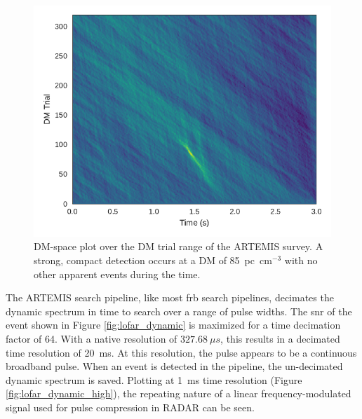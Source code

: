 \documentclass[a4paper,fleqn,usenatbib]{mnras}
\begin{document}
\begin{figure}
    \includegraphics[width=1.0\linewidth]{figures/LOFAR_dm_time.pdf}
    \caption{DM-space plot over the DM trial range of the ARTEMIS survey. A
    strong, compact detection occurs at a DM of 85~pc~cm$^{-3}$ with no other
    apparent events during the time.
    }
    \label{fig:lofar_dm_time}
\end{figure}

The ARTEMIS search pipeline, like most \gls{frb} search pipelines, decimates the
dynamic spectrum in time to search over a range of pulse widths. The \gls{snr}
of the event shown in Figure \ref{fig:lofar_dynamic} is maximized for a time
decimation factor of 64. With a native resolution of $327.68~\mu s$, this
results in a decimated time resolution of 20~ms. At this resolution, the pulse
appears to be a continuous broadband pulse. When an event is detected in the
pipeline, the un-decimated dynamic spectrum is saved. Plotting at 1~ms time
resolution (Figure \ref{fig:lofar_dynamic_high}), the repeating nature of a
linear frequency-modulated signal used for pulse compression in RADAR can be
seen.
\end{document}
